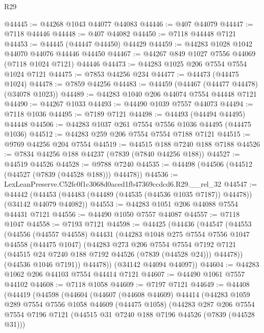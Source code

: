 \begin{lexlean}{R29}
\begin{coremodule}
@44445 := @44268 @1043 @44077 @44083
@44446 := @407 @44079
@44447 := @7118 @44446
@44448 := @407 @44082
@44450 := @7118 @44448 @7121
@44453 := @44445 (@44447 @44450) @44429
@44459 := @44283 @1028 @1042 @44070 @44076 @44446 @44450
@44467 := @44267 @849 @1027 @7556 @44069 (@7118 @1024 @7121) @44446
@44473 := @44283 @1025 @206 @7554 @7554 @1024 @7121
@44475 := @7853 @44256 @234
@44477 := @44473 (@44475 @1024)
@44478 := @7859 @44256
@44483 := @44459 (@44467 (@44477 @44478) (@34078 @1023))
@44489 := @44283 @1040 @206 @44074 @7554 @44448 @7121
@44490 := @44267 @1033
@44493 := @44490 @1039 @7557 @44073
@44494 := @7118 @1036
@44495 := @7189 @7121
@44498 := @44493 (@44494 @44495) @44448
@44506 := @44283 @1037 @261 @7554 @7556 @1036 @44495 (@44475 @1036)
@44512 := @44283 @259 @206 @7554 @7554 @7188 @7121
@44515 := @9769 @44256 @204 @7554
@44519 := @44515 @188 @7240 @188 @7188
@44526 := @7834 @44256 @188 @44237 (@7839 (@7840 @44256 @188))
@44527 := @44519 @44526
@44528 := @9788 @7240
@44535 := @44498 (@44506 (@44512 (@44527 (@7839 (@44528 @188))) @44478))
@44536 := LexLeanPreserve.C52fc0f1c3068d0aced1fb47369ccdcd6.R29.__rel_32
@44547 := @44442
    (@44453 (@44483 (@44489 (@44535 (@44536 @1035 @7187)) @44478)) (@34142 @44079 @44082))
@44553 := @44283 @1051 @206 @44088 @7554 @44431 @7121
@44556 := @44490 @1050 @7557 @44087
@44557 := @7118 @1047
@44558 := @7193 @7121
@44598 := @44425
    (@44436
      (@44547
        (@44553
          (@44556
            (@44557 @44558)
            @44431
            (@44283
              @1048
              @275
              @7554
              @7556
              @1047
              @44558
              (@44475 @1047)
              (@44283
                @273
                @206
                @7554
                @7554
                @7192
                @7121
                (@44515 @24 @7240 @188 @7192 @44526 (@7839 (@44528 @24)))
                @44478))
            (@44536 @1046 @7191))
          @44478))
      (@34142 @44094 @44097))
@44604 := @44283 @1062 @206 @44103 @7554 @44414 @7121
@44607 := @44490 @1061 @7557 @44102
@44608 := @7118 @1058
@44609 := @7197 @7121
@44649 := @44408
    (@44419
      (@44598
        (@44604
          (@44607
            (@44608 @44609)
            @44414
            (@44283
              @1059
              @289
              @7554
              @7556
              @1058
              @44609
              (@44475 @1058)
              (@44283
                @287
                @206
                @7554
                @7554
                @7196
                @7121
                (@44515 @31 @7240 @188 @7196 @44526 (@7839 (@44528 @31)))

\end{coremodule}
\end{lexlean}

